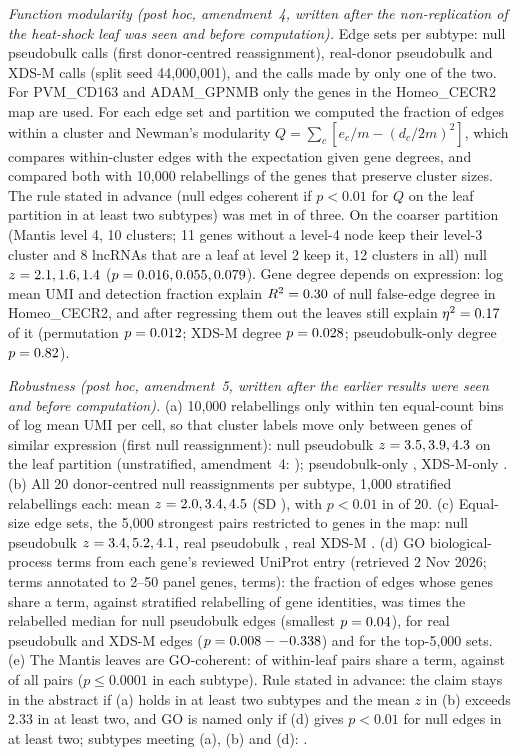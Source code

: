 {\emph{Function modularity (post hoc, amendment~4, written after the non-replication of the heat-shock leaf was seen and before computation).} Edge sets per subtype: null pseudobulk calls (first donor-centred reassignment), real-donor pseudobulk and XDS-M calls (split seed 44{,}000{,}001), and the calls made by only one of the two. For PVM\_CD163 and ADAM\_GPNMB only the \McModGenesTwoThree{} genes in the Homeo\_CECR2 map are used. For each edge set and partition we computed the fraction of edges within a cluster and Newman's modularity $Q=\sum_c[e_c/m-(d_c/2m)^2]$, which compares within-cluster edges with the expectation given gene degrees, and compared both with 10{,}000 relabellings of the genes that preserve cluster sizes. The rule stated in advance (null edges coherent if $p<0.01$ for $Q$ on the leaf partition in at least two subtypes) was met in \McModNullHolds{} of three. On the coarser partition (Mantis level 4, 10 clusters; 11 genes without a level-4 node keep their level-3 cluster and 8 lncRNAs that are a leaf at level 2 keep it, 12 clusters in all) null $z=2.1, 1.6, 1.4$ ($p=0.016, 0.055, 0.079$). Gene degree depends on expression: log mean UMI and detection fraction explain $R^2=0.30$ of null false-edge degree in Homeo\_CECR2, and after regressing them out the leaves still explain $\eta^2=0.17$ of it (permutation $p=0.012$; XDS-M degree $p=0.028$; pseudobulk-only degree $p=0.82$).

\emph{Robustness (post hoc, amendment~5, written after the earlier results were seen and before computation).} (a) 10{,}000 relabellings only within ten equal-count bins of log mean UMI per cell, so that cluster labels move only between genes of similar expression (first null reassignment): null pseudobulk $z=3.5, 3.9, 4.3$ on the leaf partition (unstratified, amendment~4: \McModNullZ); pseudobulk-only \AfPBonlyZ, XDS-M-only \AfXonlyZ. (b) All 20 donor-centred null reassignments per subtype, 1{,}000 stratified relabellings each: mean $z=2.0, 3.4, 4.5$ (SD \AfTwentySD), with $p<0.01$ in \AfTwentyN{} of 20. (c) Equal-size edge sets, the 5{,}000 strongest pairs restricted to genes in the map: null pseudobulk $z=3.4, 5.2, 4.1$, real pseudobulk \AfTopPBZ, real XDS-M \AfTopXZ. (d) GO biological-process terms from each gene's reviewed UniProt entry (retrieved 2 Nov 2026; terms annotated to 2--50 panel genes, \AfGOterms{} terms): the fraction of edges whose genes share a term, against stratified relabelling of gene identities, was \AfGONull{} times the relabelled median for null pseudobulk edges (smallest $p=0.04$), \AfGOReal{} for real pseudobulk and XDS-M edges ($p=0.008--0.338$) and \AfGOTop{} for the top-5{,}000 sets. (e) The Mantis leaves are GO-coherent: \AfLeafGOin{} of within-leaf pairs share a term, against \AfLeafGOall{} of all pairs ($p\le0.0001$ in each subtype). Rule stated in advance: the claim stays in the abstract if (a) holds in at least two subtypes and the mean $z$ in (b) exceeds 2.33 in at least two, and GO is named only if (d) gives $p<0.01$ for null edges in at least two; subtypes meeting (a), (b) and (d): \AfRule.}
